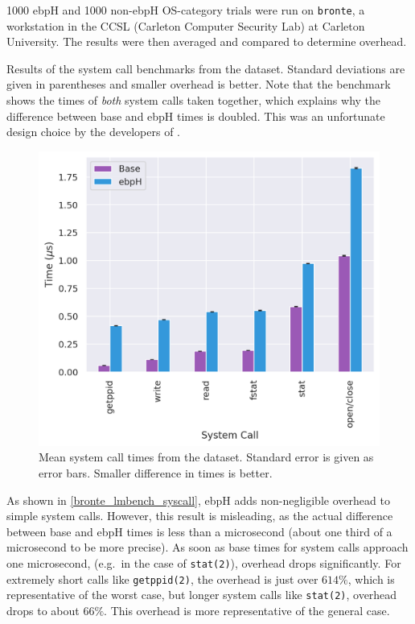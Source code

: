\documentclass[
  12pt]{findlay}
\newcommand{\passthrough}[1]{#1}
\begin{document}
\label{bronte_lmbench}

1000 ebpH and 1000 non-ebpH OS-category trials were run on
\passthrough{\lstinline!bronte!}, a workstation in the CCSL (Carleton
Computer Security Lab) at Carleton University. The results were then
averaged and compared to determine overhead.

\begin{table}
    \caption[Results of the system call benchmarks from the  dataset]{
        Results of the system call benchmarks from the  dataset.
        Standard deviations are given in parentheses and smaller overhead is better. Note that the 
        benchmark shows the times of \emph{both} system calls taken together, which explains why the difference
        between base and ebpH times is doubled. This was an unfortunate design choice by the developers of .
    }
    \label{bronte_lmbench_syscall}
    
\end{table}

\begin{figure}
    \caption[Mean system call times from the  dataset]{
        Mean system call times from the  dataset.
        Standard error is given as error bars.
        Smaller difference in times is better.
    }
    \label{bronte_lmbench_syscall_graph}
    \includegraphics[width=.8\textwidth]{../data/bench/bronte-lmbench/syscall_times.png}
\end{figure}

As shown in \autoref{bronte_lmbench_syscall}, ebpH adds non-negligible
overhead to simple system calls. However, this result is misleading, as
the actual difference between base and ebpH times is less than a
microsecond (about one third of a microsecond to be more precise). As
soon as base times for system calls approach one microsecond, (e.g.~in
the case of \passthrough{\lstinline!stat(2)!}), overhead drops
significantly. For extremely short calls like
\passthrough{\lstinline!getppid(2)!}, the overhead is just over
\(614\%\), which is representative of the worst case, but longer system
calls like \passthrough{\lstinline!stat(2)!}, overhead drops to about
\(66\%\). This overhead is more representative of the general case.
\end{document}
